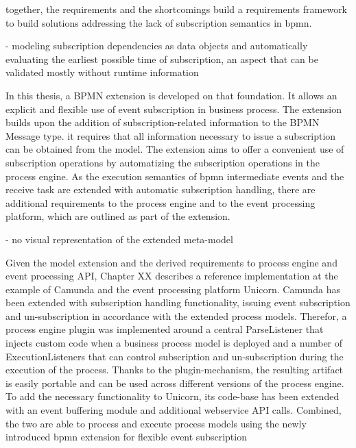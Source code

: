 together, the requirements and the shortcomings build a requirements framework to build solutions addressing the lack of subscription semantics in bpmn.

- modeling subscription dependencies as data objects and automatically evaluating the earliest possible time of subscription, an aspect that can be validated mostly without runtime information

In this thesis, a BPMN extension is developed on that foundation. It allows an explicit and flexible use of event subscription in business process.
The extension builds upon the addition of subscription-related information to the BPMN Message type. it requires that all information necessary to issue a subscription can be obtained from the model.
The extension aims to offer a convenient use of subscription operations by automatizing the subscription operations in the process engine.
As the execution semantics of bpmn intermediate events and the receive task are extended with automatic subscription handling, there are additional requirements to the process engine and to the event processing platform, which are outlined as part of the extension.

- no visual representation of the extended meta-model

Given the model extension and the derived requirements to process engine and event processing API, Chapter XX describes a reference implementation at the example of Camunda and the event processing platform Unicorn.
Camunda has been extended with subscription handling functionality, issuing event subscription and un-subscription in accordance with the extended process models.
Therefor, a process engine plugin was implemented around a central ParseListener that injects custom code when a business process model is deployed and a number of ExecutionListeners that can control subscription and un-subscription during the execution of the process.
Thanks to the plugin-mechanism, the resulting artifact is easily portable and can be used across different versions of the process engine.
To add the necessary functionality to Unicorn, its code-base has been extended with an event buffering module and additional webservice API calls.
Combined, the two are able to process and execute process models using the newly introduced bpmn extension for flexible event subscription


